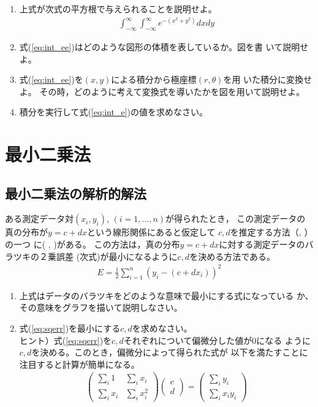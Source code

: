 \documentclass[twocolumn,11pt]{jarticle}
\begin{document}
\begin{enumerate}
\item 上式が次式の平方根で与えられることを説明せよ。
  \begin{align}
    \label{eq:int_ee}
    \int_{-\infty}^{\infty}\int_{-\infty}^{\infty}e^{-(x^2+y^2)}dxdy
  \end{align}
\item 式(\ref{eq:int_ee})はどのような図形の体積を表しているか。図を書
  いて説明せよ。
\item 式(\ref{eq:int_ee})を$(x,y)$による積分から極座標$(r,\theta)$を用
  いた積分に変換せよ。
  その時，どのように考えて変換式を導いたかを図を用いて説明せよ。
\item 積分を実行して式(\ref{eq:int_e})の値を求めなさい。
\end{enumerate}%

\section{最小二乗法}
\subsection{最小二乗法の解析的解法}

ある測定データ対$(x_i,y_i)$, $(i=1,...,n)$が得られたとき，
この測定データの真の分布が$y=c+dx$という線形関係にあると仮定して
$c,d$を推定する方法（, 
）の一つ
に(
, )がある。
この方法は，真の分布$y=c+dx$に対する測定データのバラツキの２乗誤差
(次式)が最小になるように$c,d$を決める方法である。
\begin{align}
\label{eq:sqerr}
  E=\frac{1}{2}\sum_{i=1}^{n}(y_i-(c+dx_i))^2
\end{align}
\begin{enumerate}
\item 上式はデータのバラツキをどのような意味で最小にする式になっている
  か、その意味をグラフを描いて説明しなさい。
\item 式(\ref{eq:sqerr})を最小にする$c,d$を求めなさい。\\
ヒント）式(\ref{eq:sqerr})を$c,d$それぞれについて偏微分した値が0になる
ように$c,d$を決める。このとき，偏微分によって得られた式が
以下を満たすことに注目すると計算が簡単になる。
\begin{align}
  \label{eq:sol-minsq}
  \begin{pmatrix}
    \sum_i1   &  \sum_ix_i \\
    \sum_ix_i &  \sum_ix_i^2
  \end{pmatrix}
  \begin{pmatrix}
    c \\ d
  \end{pmatrix}
  =
  \begin{pmatrix}
    \sum_iy_i\\ \sum_ix_iy_i
  \end{pmatrix}
\end{align}
\end{enumerate}%
\end{document}
